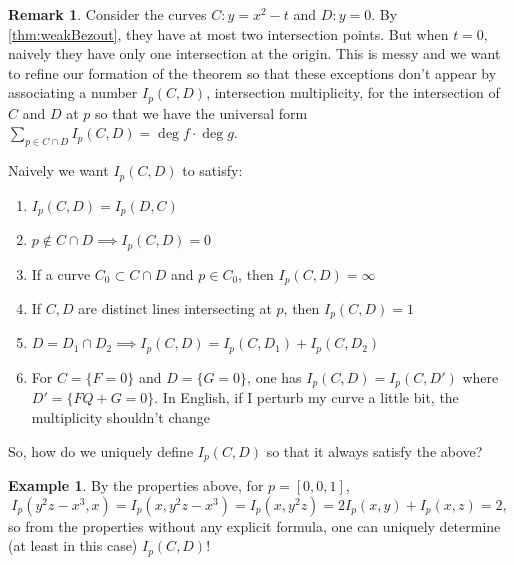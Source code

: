 \documentclass{article}
\theoremstyle{definition}
\newtheorem{example}[defn]{Example}
\newtheorem{remark}[defn]{Remark}
\begin{document}
\begin{remark}
Consider the curves $C:y=x^2-t$ and $D:y=0$. By \ref{thm:weakBezout}, they have at most two intersection points. But when $t=0$, naively they have only one intersection at the origin. This is messy and we want to refine our formation of the theorem so that these exceptions don't appear by associating a number $I_p(C,D)$, intersection multiplicity, for the intersection of $C$ and $D$ at $p$ so that we have the universal form $\sum_{p\in C\cap D}I_p(C,D)=\deg f\cdot \deg g$.

Naively we want $I_p(C,D)$ to satisfy:
\begin{enumerate}
\item $I_p(C,D)=I_p(D,C)$
\item $p\notin C\cap D\implies I_p(C,D)=0$
\item If a curve $C_0\subset C\cap D$ and $p\in C_0$, then $I_p(C,D)=\infty$
\item If $C,D$ are distinct lines intersecting at $p$, then $I_p(C,D)=1$
\item $D=D_1\cap D_2\implies I_p(C,D)=I_p(C,D_1)+I_p(C,D_2)$
\item For $C=\{F=0\}$ and $D=\{G=0\}$, one has $I_p(C,D)=I_p(C,D')$ where $D'=\{FQ+G=0\}$. In English, if I perturb my curve a little bit, the multiplicity shouldn't change
\end{enumerate}
So, how do we uniquely define $I_p(C,D)$ so that it always satisfy the above?
\end{remark}

\begin{example}
By the properties above, for $p=[0,0,1]$,
\[
I_p(y^2z-x^3,x)=I_p(x,y^2z-x^3)=I_p(x,y^2z)=2I_p(x,y)+I_p(x,z)=2,
\]
so from the properties without any explicit formula, one can uniquely determine (at least in this case) $I_p(C,D)$!
\end{example}
\end{document}
